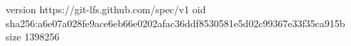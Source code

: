 version https://git-lfs.github.com/spec/v1
oid sha256:a6e07a028fe9ace6eb66e0202afac36ddf8530581e5d02c99367e33f35ca915b
size 1398256

